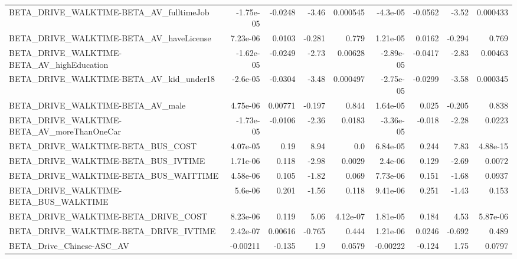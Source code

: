 \begin{tabular}{lrrrrrrrr}
BETA\_DRIVE\_WALKTIME-BETA\_AV\_fulltimeJob            &   -1.75e-05 &      -0.0248 &     -3.46 & 0.000545 &   -4.3e-05 &     -0.0562 &        -3.52 &      0.000433 \\
BETA\_DRIVE\_WALKTIME-BETA\_AV\_haveLicense            &    7.23e-06 &       0.0103 &    -0.281 &    0.779 &   1.21e-05 &      0.0162 &       -0.294 &         0.769 \\
BETA\_DRIVE\_WALKTIME-BETA\_AV\_highEducation          &   -1.62e-05 &      -0.0249 &     -2.73 &  0.00628 &  -2.89e-05 &     -0.0417 &        -2.83 &       0.00463 \\
BETA\_DRIVE\_WALKTIME-BETA\_AV\_kid\_under18            &    -2.6e-05 &      -0.0304 &     -3.48 & 0.000497 &  -2.75e-05 &     -0.0299 &        -3.58 &      0.000345 \\
BETA\_DRIVE\_WALKTIME-BETA\_AV\_male                   &    4.75e-06 &      0.00771 &    -0.197 &    0.844 &   1.64e-05 &       0.025 &       -0.205 &         0.838 \\
BETA\_DRIVE\_WALKTIME-BETA\_AV\_moreThanOneCar         &   -1.73e-05 &      -0.0106 &     -2.36 &   0.0183 &  -3.36e-05 &      -0.018 &        -2.28 &        0.0223 \\
BETA\_DRIVE\_WALKTIME-BETA\_BUS\_COST                  &    4.07e-05 &         0.19 &      8.94 &      0.0 &   6.84e-05 &       0.244 &         7.83 &      4.88e-15 \\
BETA\_DRIVE\_WALKTIME-BETA\_BUS\_IVTIME                &    1.71e-06 &        0.118 &     -2.98 &   0.0029 &    2.4e-06 &       0.129 &        -2.69 &        0.0072 \\
BETA\_DRIVE\_WALKTIME-BETA\_BUS\_WAITTIME              &    4.58e-06 &        0.105 &     -1.82 &    0.069 &   7.73e-06 &       0.151 &        -1.68 &        0.0937 \\
BETA\_DRIVE\_WALKTIME-BETA\_BUS\_WALKTIME              &     5.6e-06 &        0.201 &     -1.56 &    0.118 &   9.41e-06 &       0.251 &        -1.43 &         0.153 \\
BETA\_DRIVE\_WALKTIME-BETA\_DRIVE\_COST                &    8.23e-06 &        0.119 &      5.06 & 4.12e-07 &   1.81e-05 &       0.184 &         4.53 &      5.87e-06 \\
BETA\_DRIVE\_WALKTIME-BETA\_DRIVE\_IVTIME              &    2.42e-07 &      0.00616 &    -0.765 &    0.444 &   1.21e-06 &      0.0246 &       -0.692 &         0.489 \\
BETA\_Drive\_Chinese-ASC\_AV                          &    -0.00211 &       -0.135 &       1.9 &   0.0579 &   -0.00222 &      -0.124 &         1.75 &        0.0797 \\

\end{tabular}
